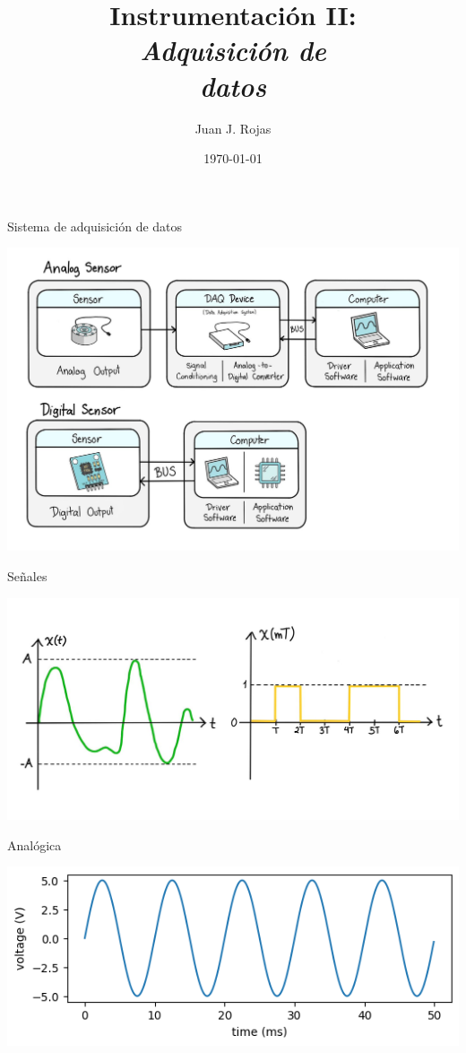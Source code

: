 \documentclass[aspectratio=169]{beamer}
\title{Instrumentación II: \\ \emph{Adquisición de}\\ \emph{datos}}
\author{Juan J. Rojas}
\institute{Instituto Tecnológico de Costa Rica}
\date{\today}
\begin{document}

\maketitle

\newcommand{\blackandwhite}{white} %

\begin{frame}{Sistema de adquisición de datos}
\begin{center}
    \includegraphics[width=0.7\linewidth]{presentaciones/fig/daqs.jpg}
\end{center}
\end{frame}

\begin{frame}{Señales}
\begin{center}
    \includegraphics[width=0.8\linewidth]{presentaciones/fig/analogicavrsdigital.jpg}
\end{center}
\end{frame}

\begin{frame}{Analógica}
\begin{center}
    \includegraphics[width=0.8\linewidth]{presentaciones/fig/analogsignal.png}
\end{center}
\end{frame}
\end{document}
